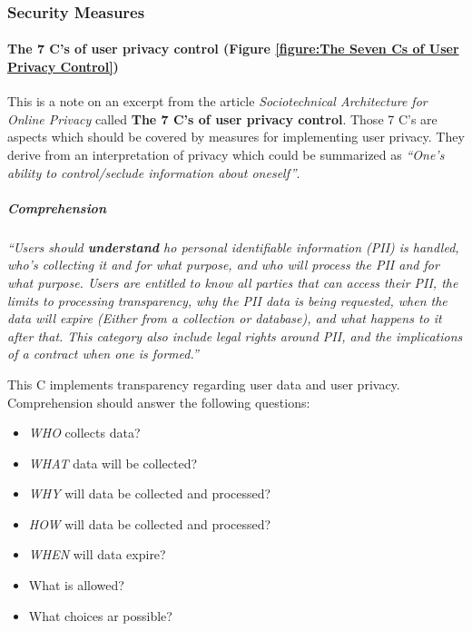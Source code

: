 \subsubsection{Security Measures}

\paragraph{The 7 C's of user privacy control (Figure \ref{figure:The Seven Cs of User Privacy Control})}

This is a note on an excerpt from the article \emph{Sociotechnical
Architecture for Online Privacy} \cite{1} called
\textbf{The 7 C's of user privacy control}. Those 7 C's are aspects
which should be covered by measures for implementing user privacy. They
derive from an interpretation of privacy which could be summarized as
\emph{``One's ability to control/seclude information about oneself''}.



\subparagraph{Comprehension}

\emph{``Users should \textbf{understand} ho personal identifiable
information (PII) is handled, who's collecting it and for what purpose,
and who will process the PII and for what purpose. Users are entitled
to know all parties that can access their PII, the limits to processing
transparency, why the PII data is being requested, when the data will
expire (Either from a collection or database), and what happens to it
after that. This category also include legal rights around PII, and the
implications of a contract when one is formed.''}

This C implements transparency regarding user data and user privacy.
Comprehension should answer the following questions:

\begin{itemize}

\item
  \emph{WHO} collects data?
\item
  \emph{WHAT} data will be collected?
\item
  \emph{WHY} will data be collected and processed?
\item
  \emph{HOW} will data be collected and processed?
\item
  \emph{WHEN} will data expire?
\item
  What is allowed?
\item
  What choices ar possible?
\end{itemize}


